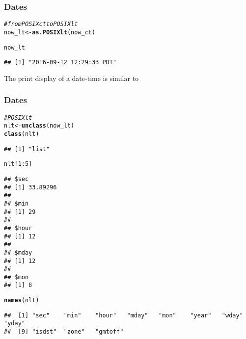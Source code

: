 \documentclass[12pt]{beamer}\usepackage[]{graphicx}\usepackage[]{color}
\makeatletter
\newcommand{\hlnum}[1]{\textcolor[rgb]{0.686,0.059,0.569}{#1}}%
\newcommand{\hlcom}[1]{\textcolor[rgb]{0.678,0.584,0.686}{\textit{#1}}}%
\newcommand{\hlopt}[1]{\textcolor[rgb]{0,0,0}{#1}}%
\newcommand{\hlstd}[1]{\textcolor[rgb]{0.345,0.345,0.345}{#1}}%
\newcommand{\hlkwb}[1]{\textcolor[rgb]{0.69,0.353,0.396}{#1}}%
\newcommand{\hlkwd}[1]{\textcolor[rgb]{0.737,0.353,0.396}{\textbf{#1}}}%
\newenvironment{kframe}{%
 \def\at@end@of@kframe{}%
 \ifinner\ifhmode%
  \def\at@end@of@kframe{\end{minipage}}%
  \begin{minipage}{\columnwidth}%
 \fi\fi%
 \def\FrameCommand##1{\hskip\@totalleftmargin \hskip-\fboxsep
 \colorbox{shadecolor}{##1}\hskip-\fboxsep
     \hskip-\linewidth \hskip-\@totalleftmargin \hskip\columnwidth}%
 \MakeFramed {\advance\hsize-\width
   \@totalleftmargin\z@ \linewidth\hsize
   \@setminipage}}%
 {\par\unskip\endMakeFramed%
 \at@end@of@kframe}
\newenvironment{knitrout}{}{} %
\makeatother
\begin{document}
\begin{frame}[fragile]
\frametitle{ Dates}

\begin{knitrout}\footnotesize
{}\color{fgcolor}\begin{kframe}
\begin{alltt}
\hlcom{# from POSIXct to POSIXlt}
\hlstd{now_lt} \hlkwb{<-} \hlkwd{as.POSIXlt}\hlstd{(now_ct)}

\hlstd{now_lt}
\end{alltt}
\begin{verbatim}
## [1] "2016-09-12 12:29:33 PDT"
\end{verbatim}
\end{kframe}
\end{knitrout}
The print display of a  date-time is similar to 

\end{frame}


\begin{frame}[fragile]
\frametitle{ Dates}

\begin{knitrout}\footnotesize
{}\color{fgcolor}\begin{kframe}
\begin{alltt}
\hlcom{# POSIXlt}
\hlstd{nlt} \hlkwb{<-} \hlkwd{unclass}\hlstd{(now_lt)}
\hlkwd{class}\hlstd{(nlt)}
\end{alltt}
\begin{verbatim}
## [1] "list"
\end{verbatim}
\begin{alltt}
\hlstd{nlt[}\hlnum{1}\hlopt{:}\hlnum{5}\hlstd{]}
\end{alltt}
\begin{verbatim}
## $sec
## [1] 33.89296
## 
## $min
## [1] 29
## 
## $hour
## [1] 12
## 
## $mday
## [1] 12
## 
## $mon
## [1] 8
\end{verbatim}
\begin{alltt}
\hlkwd{names}\hlstd{(nlt)}
\end{alltt}
\begin{verbatim}
##  [1] "sec"    "min"    "hour"   "mday"   "mon"    "year"   "wday"   "yday"  
##  [9] "isdst"  "zone"   "gmtoff"
\end{verbatim}
\end{kframe}
\end{knitrout}

\end{frame}
\end{document}

